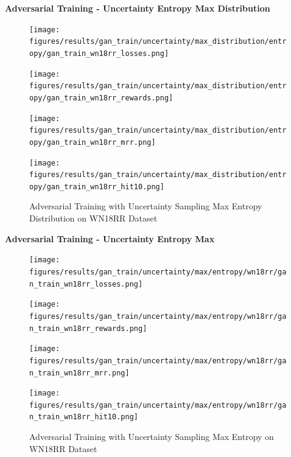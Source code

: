 \pagebreak

\textbf{Adversarial Training - Uncertainty Entropy Max Distribution}\\
\begin{figure}
    \centering
    \begin{minipage}{.5\textwidth}
      \centering
      \texttt{[image: figures/results/gan\_train/uncertainty/max\_distribution/entropy/gan\_train\_wn18rr\_losses.png]}
    \end{minipage}%
    \begin{minipage}{.5\textwidth}
      \centering
      \texttt{[image: figures/results/gan\_train/uncertainty/max\_distribution/entropy/gan\_train\_wn18rr\_rewards.png]}
    \end{minipage}
    \begin{minipage}{.5\textwidth}
      \centering
      \texttt{[image: figures/results/gan\_train/uncertainty/max\_distribution/entropy/gan\_train\_wn18rr\_mrr.png]}
   \end{minipage}%
    \begin{minipage}{.5\textwidth}
      \centering
      \texttt{[image: figures/results/gan\_train/uncertainty/max\_distribution/entropy/gan\_train\_wn18rr\_hit10.png]}
    \end{minipage}%
    \caption{Adversarial Training with Uncertainty Sampling Max Entropy Distribution on \textsc{WN18RR} Dataset}
    \label{fig:test}
\end{figure}

\pagebreak

\textbf{Adversarial Training - Uncertainty Entropy Max}\\
\begin{figure}
    \centering
    \begin{minipage}{.5\textwidth}
      \centering
      \texttt{[image: figures/results/gan\_train/uncertainty/max/entropy/wn18rr/gan\_train\_wn18rr\_losses.png]}
    \end{minipage}%
    \begin{minipage}{.5\textwidth}
      \centering
      \texttt{[image: figures/results/gan\_train/uncertainty/max/entropy/wn18rr/gan\_train\_wn18rr\_rewards.png]}
    \end{minipage}
    \begin{minipage}{.5\textwidth}
      \centering
      \texttt{[image: figures/results/gan\_train/uncertainty/max/entropy/wn18rr/gan\_train\_wn18rr\_mrr.png]}
   \end{minipage}%
    \begin{minipage}{.5\textwidth}
      \centering
      \texttt{[image: figures/results/gan\_train/uncertainty/max/entropy/wn18rr/gan\_train\_wn18rr\_hit10.png]}
    \end{minipage}%
    \caption{Adversarial Training with Uncertainty Sampling Max Entropy on \textsc{WN18RR} Dataset}
    \label{fig:test}
\end{figure}